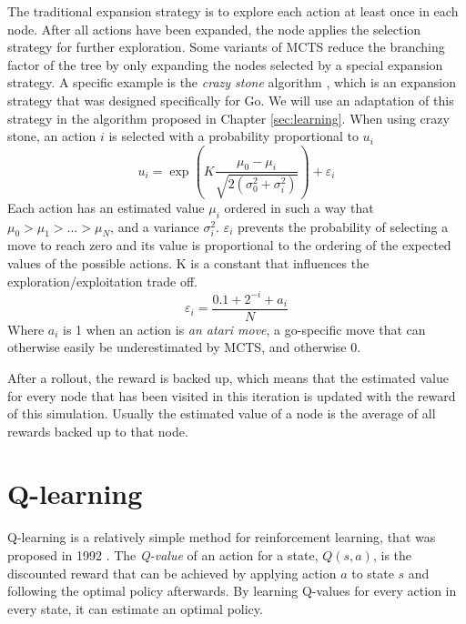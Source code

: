The traditional expansion strategy is to explore each action at least once in
each node. After all actions have been expanded, the node applies the selection
strategy for further exploration. Some variants of MCTS reduce the branching
factor of the tree by only expanding the nodes selected by a special expansion
strategy. A specific example is the \emph{crazy stone} algorithm
\cite{coulom2007efficient}, which is an expansion strategy that was designed
specifically for Go. We will use an adaptation of this strategy in the algorithm
proposed in Chapter \ref{sec:learning}.  When using crazy stone, an action $i$
is selected with a probability proportional to $u_i$
\begin{equation}
	\label{eq:crazystone}
	u_i = \exp\left(K \frac{\mu_0 - \mu_i}{\sqrt{2\left(\sigma_0^2 +
\sigma_i^2\right)}}\right) + \varepsilon_i
\end{equation}
Each action has an estimated value $\mu_i$ ordered in such a way that $\mu_0 >
\mu_1 > \ldots > \mu_N$, and a variance $\sigma_i^2$. $\varepsilon_i$ prevents 
the probability of selecting a move to reach zero and its value is proportional to
the ordering of the expected values of the possible actions. K is a constant
that influences the exploration/exploitation trade off.
\begin{equation}
	\label{eq:epsilon}
	\varepsilon_i = \frac{0.1 + 2^{-i} + a_i}{N}
\end{equation}
Where $a_i$ is 1 when an action is \emph{an atari move}, a go-specific
move that can otherwise easily be underestimated by MCTS, and otherwise 0.

After a rollout, the reward is backed up, which means that the estimated value
for every node that has been visited in this iteration is updated with the
reward of this simulation. Usually the estimated value of a node is the average
of all rewards backed up to that node.

\section{Q-learning}
\label{subsec:qlearning}
Q-learning is a relatively simple method for reinforcement learning,
that was proposed in 1992 \cite{watkins1992q}. The \emph{Q-value} of an action
for a state, $Q(s, a)$, is the discounted reward that can be achieved by
applying action $a$ to state $s$ and following the optimal policy afterwards. By
learning Q-values for every action in every state, it can estimate an optimal
policy. 

